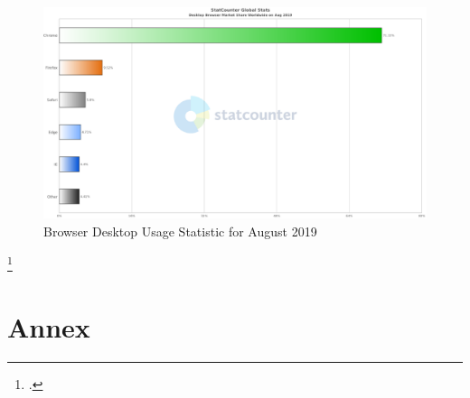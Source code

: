 \newpage

\begin{figure}[hbt]
	\centering
	\includegraphics[scale=0.48, keepaspectratio, angle=90]{pics/StatCounter-browser-ww-monthly-201908-201908-bar_desktop.eps}
	\caption[Browser Desktop Usage Statistic for August 2019]{Browser Desktop Usage Statistic for August 2019\footnotemark}
	\label{fig:stats-desktop}
\end{figure}
\footcitetext[Source][]{statcounter-desktop}

\chapter{Annex}


